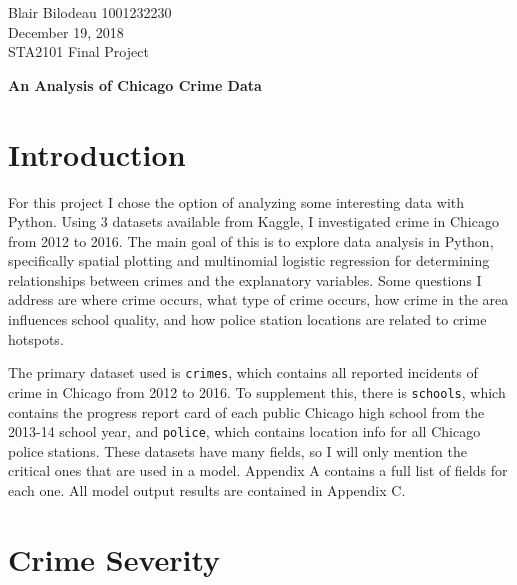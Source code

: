 \documentclass[11pt]{article}
\newcommand{\1}{\mathds{1}}
\def\code#1{\texttt{#1}}
\begin{document}

\noindent
Blair Bilodeau 1001232230 \\
December 19, 2018 \\
STA2101 Final Project 

\begin{center}
	\textbf{An Analysis of Chicago Crime Data}
\end{center}



\section{Introduction}

For this project I chose the option of analyzing some interesting data with Python. Using 3 datasets available from Kaggle, I investigated crime in Chicago from 2012 to 2016. The main goal of this is to explore data analysis in Python, specifically spatial plotting and multinomial logistic regression for determining relationships between crimes and the explanatory variables. Some questions I address are where crime occurs, what type of crime occurs, how crime in the area influences school quality, and how police station locations are related to crime hotspots.

The primary dataset used is \code{crimes}, which contains all reported incidents of crime in Chicago from 2012 to 2016. To supplement this, there is \code{schools}, which contains the progress report card of each public Chicago high school from the 2013-14 school year, and \code{police}, which contains location info for all Chicago police stations. These datasets have many fields, so I will only mention the critical ones that are used in a model. Appendix A contains a full list of fields for each one. All model output results are contained in Appendix C.


\section{Crime Severity}
\end{document}
